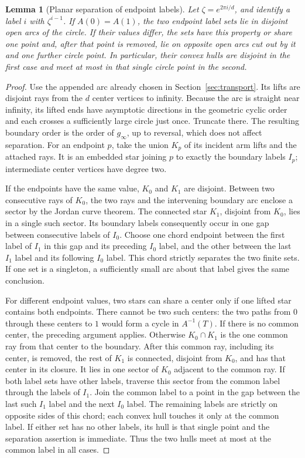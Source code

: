 \documentclass[11pt]{article}
\numberwithin{equation}{section}
\newtheorem{lemma}[theorem]{Lemma}
\theoremstyle{definition}\newtheorem{definition}[theorem]{Definition}
\theoremstyle{remark}\newtheorem{remark}[theorem]{Remark}
\begin{document}
\begin{lemma}[Planar separation of endpoint labels]\label{lem:separation}
Let $\zeta=e^{2\pi i/d}$, and identify a label $i$ with $\zeta^{i-1}$.
If $A(0)=A(1)$, the two endpoint label sets lie in disjoint open arcs
of the circle. If their values differ, the sets have this property or
share one point and, after that point is removed, lie on opposite open
arcs cut out by it and one further circle point. In particular, their
convex hulls are disjoint in the first case and meet at most in that
single circle point in the second.
\end{lemma}
\begin{proof}
Use the appended arc already chosen in Section~\ref{sec:transport}.
Its lifts are disjoint rays from the $d$ center vertices to infinity.
Because the arc is straight near infinity, its lifted ends have
asymptotic directions in the geometric cyclic order and each crosses
a sufficiently large circle just once. Truncate there. The resulting
boundary order is the order of $g_\infty$, up to reversal, which does
not affect separation.
For an endpoint $p$, take the union $K_p$ of its incident arm lifts and
the attached rays. It is an embedded star joining $p$ to exactly the
boundary labels $I_p$; intermediate center vertices have degree two.

If the endpoints have the same value, $K_0$ and $K_1$ are disjoint.
Between two consecutive rays of $K_0$, the two rays and the intervening
boundary arc enclose a sector by the Jordan curve theorem. The connected
star $K_1$, disjoint from $K_0$, lies in a single such sector. Its boundary
labels consequently occur in one gap between consecutive labels of
$I_0$. Choose one chord endpoint between the first label of $I_1$ in
this gap and its preceding $I_0$ label, and the other between the last
$I_1$ label and its following $I_0$ label. This chord strictly separates
the two finite sets. If one set is a singleton, a sufficiently small
arc about that label gives the same conclusion.

For different endpoint values, two stars can share a center only if
one lifted star contains both endpoints. There cannot be two such
centers: the two paths from $0$ through these centers to $1$ would
form a cycle in $A^{-1}(T)$. If there is no common center, the preceding
argument applies. Otherwise $K_0\cap K_1$ is the one common ray from that
center to the boundary. After this common ray, including its center,
is removed, the rest of $K_1$ is connected, disjoint from $K_0$, and
has that center in its closure. It lies in one sector of $K_0$
adjacent to the common ray. If both label sets have other labels,
traverse this sector from the common label through the labels of $I_1$.
Join the common label to a point in the gap between the last such
$I_1$ label and the next $I_0$ label. The remaining labels are strictly
on opposite sides of this chord; each convex hull touches it only at
the common label. If either set has no other labels, its hull is that
single point and the separation assertion is immediate. Thus the two
hulls meet at most at the common label in all cases.
\end{proof}
\end{document}
